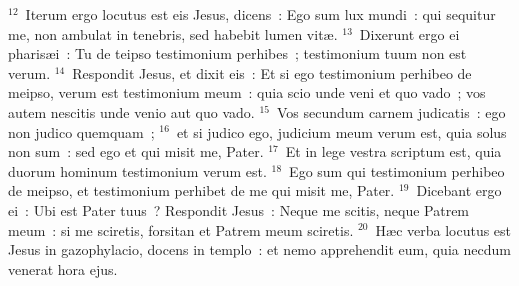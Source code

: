 ${}^{12}$~Iterum ergo locutus est eis Jesus, dicens~: Ego sum lux mundi~: qui sequitur me, non ambulat in tenebris, sed habebit lumen vit\ae .
${}^{13}$~Dixerunt ergo ei pharis\ae i~: Tu de teipso testimonium perhibes~; testimonium tuum non est verum.
${}^{14}$~Respondit Jesus, et dixit eis~: Et si ego testimonium perhibeo de meipso, verum est testimonium meum~: quia scio unde veni et quo vado~; vos autem nescitis unde venio aut quo vado.
${}^{15}$~Vos secundum carnem judicatis~: ego non judico quemquam~;
${}^{16}$~et si judico ego, judicium meum verum est, quia solus non sum~: sed ego et qui misit me, Pater.
${}^{17}$~Et in lege vestra scriptum est, quia duorum hominum testimonium verum est.
${}^{18}$~Ego sum qui testimonium perhibeo de meipso, et testimonium perhibet de me qui misit me, Pater.
${}^{19}$~Dicebant ergo ei~: Ubi est Pater tuus~? Respondit Jesus~: Neque me scitis, neque Patrem meum~: si me sciretis, forsitan et Patrem meum sciretis.
${}^{20}$~H\ae c verba locutus est Jesus in gazophylacio, docens in templo~: et nemo apprehendit eum, quia necdum venerat hora ejus.


